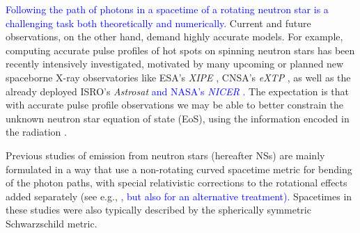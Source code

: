 \documentclass{aa}
\newcommand{\refe}[1]{\textcolor{blue}{{#1}}}
\newcommand{\refedel}[1]{}
\newcommand{\sch}{Schwarzschild }
\begin{document}
\refe{Following the path of photons in a spacetime of a rotating neutron star is a challenging task both theoretically and numerically.}
Current and future observations, on the other hand, demand highly accurate models.
For example, computing accurate pulse profiles of hot spots on spinning neutron stars has been recently intensively investigated, motivated by many upcoming or planned new spaceborne X-ray observatories like ESA's \textit{XIPE} \citep{XIPE}, CNSA's \textit{eXTP} \citep{eXTP}, as well as the already deployed ISRO's \textit{Astrosat} \citep{Astrosat} \refe{and NASA's \textit{NICER} \citep{NICER}.}
The expectation is that with accurate pulse profile observations we may be able to better constrain the unknown neutron star equation of state (EoS), using the information encoded in the radiation \citep[see e.g.,][]{LMB13}.

Previous studies of emission from neutron stars (hereafter NSs) are mainly formulated in a way that use a non-rotating curved spacetime metric for bending of the photon paths, with special relativistic corrections to the rotational effects added separately\refedel{, in an ad-hoc manner} (see e.g.,\refe{ \citealt{PFC83,P95, ML98, WM01, PG03, PB06, Lamb09a, Lamb09b, LMB13, ML15}, but also \citealt{BR01} for \refe{an alternative} treatment).} 
Spacetimes in these studies were also typically described by the spherically symmetric \sch metric.
\end{document}
